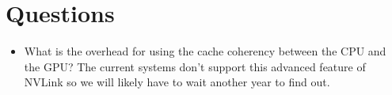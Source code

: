 \documentclass{article}
\begin{document}
\section{Questions}
\begin{itemize}
  \item What is the overhead for using the cache coherency between the
    CPU and the GPU?
    The current systems don't support this advanced feature of NVLink so we will
    likely have to wait another year to find out.
\end{itemize}



\end{document}
